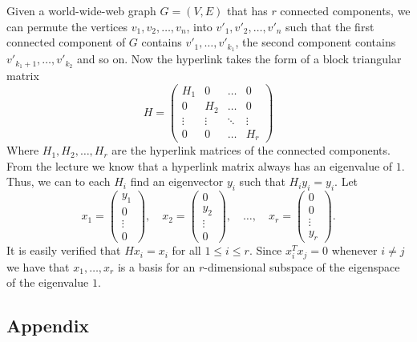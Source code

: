 \documentclass[a4paper,12pt]{article}
\begin{document}
Given a world-wide-web graph \(G = (V,E)\) that has \(r\) connected components,
we can permute the vertices \(v_1,v_2,\dots,v_n\), into \(v'_1,v'_2,\dots,v'_n\)
such that the first connected component of \(G\) contains
\(v'_1,\dots,v'_{k_1}\), the second component contains
\(v'_{k_1+1},\dots,v'_{k_2}\) and so on.
Now the hyperlink takes the form of a block triangular matrix
\[
  H =
    \begin{pmatrix}
      H_1    & 0      & \hdots & 0      \\
      0      & H_2    & \hdots & 0      \\
      \vdots & \vdots & \ddots & \vdots \\
      0      & 0      & \hdots & H_r
    \end{pmatrix}
\]
Where \(H_1,H_2,\dots,H_r\) are the hyperlink matrices of the connected
components.
From the lecture we know that a hyperlink matrix always has an eigenvalue of
\(1\).
Thus, we can to each \(H_i\) find an eigenvector \(y_i\) such that
\(H_iy_i = y_i\).
Let
\[
  x_1 =
    \begin{pmatrix}
      y_1 \\
      0 \\
      \vdots \\
      0
    \end{pmatrix},
  \quad
  x_2 =
    \begin{pmatrix}
      0 \\
      y_2 \\
      \vdots \\
      0
    \end{pmatrix},
  \quad
  \dots,
  \quad
  x_r =
    \begin{pmatrix}
      0 \\
      0 \\
      \vdots \\
      y_r
    \end{pmatrix}.
\]
It is easily verified that \(Hx_i = x_i\) for all \(1 \le i \le r\).
Since \(x_i^Tx_j = 0\) whenever \(i \ne j\) we have that \(x_1,\dots,x_r\) is a
basis for an \(r\)-dimensional subspace of the eigenspace of the eigenvalue
\(1\).


\clearpage


\subsection*{Appendix}


\end{document}
